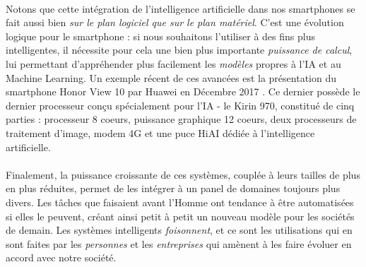 \paragraph{} Notons que cette intégration de l'intelligence artificielle dans nos smartphones se fait aussi bien \emph{sur le plan logiciel que
sur le plan matériel}. C'est une évolution logique pour le smartphone : si nous souhaitons l'utiliser à des fins plus intelligentes, il nécessite
pour cela une bien plus importante \emph{puissance de calcul}, lui permettant d'appréhender plus facilement les \emph{modèles} propres à l'IA et au
Machine Learning. Un exemple récent de ces avancées est la présentation du smartphone Honor View 10 par Huawei en Décembre 2017 \cite{Smartphone1}.
Ce dernier possède le dernier processeur conçu spécialement pour l'IA - le Kirin 970, constitué de cinq parties : processeur 8 coeurs, puissance
graphique 12 coeurs, deux processeurs de traitement d'image, modem 4G et une puce HiAI dédiée à l'intelligence artificielle.

\paragraph{} Finalement, la puissance croissante de ces systèmes, couplée à leurs tailles de plus en plus réduites, permet de les intégrer à un
panel de domaines toujours plus divers. Les tâches que faisaient avant l'Homme ont tendance à être automatisées si elles le peuvent, créant 
ainsi petit à petit un nouveau modèle pour les sociétés de demain. Les systèmes intelligents \emph{foisonnent}, et ce sont les utilisations
qui en sont faites par les \emph{personnes} et les \emph{entreprises} qui amènent à les faire évoluer en accord avec notre société. 
